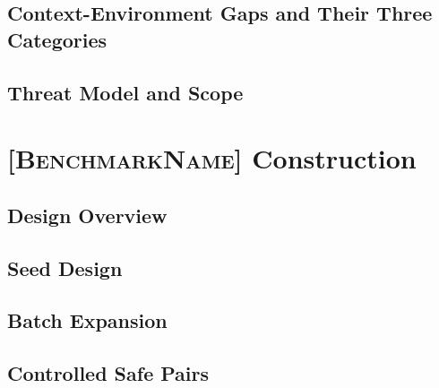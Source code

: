 \documentclass[10pt]{article}
\newcommand{\bench}{\textsc{[BenchmarkName]}}
\begin{document}
\subsection{Context-Environment Gaps and Their Three Categories}
\subsection{Threat Model and Scope}

\section{\bench{} Construction}
\subsection{Design Overview}
\subsection{Seed Design}
\subsection{Batch Expansion}
\subsection{Controlled Safe Pairs}
\end{document}
